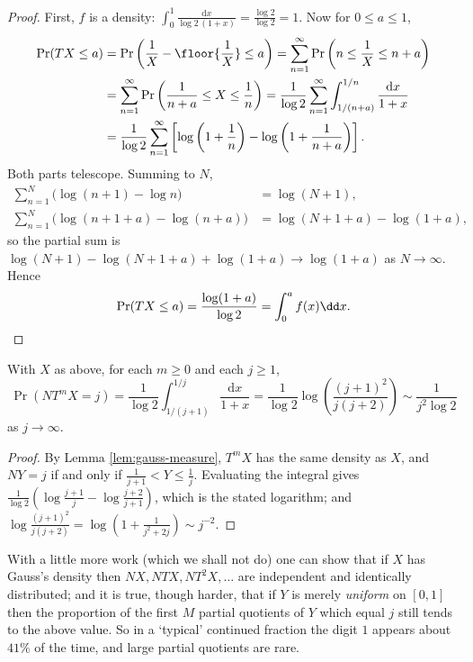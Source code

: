 \begin{proof}
	First, $f$ is a density: $\int_0^1\frac{\mathrm dx}{\log2\,(1+x)} = \frac{\log2}{\log2}=1$. Now for $0\leq a\leq 1$,
	\begin{align*}
		\Pr(TX\leq a) &= \Pr\left(\frac1X - \floor{\frac1X}\leq a\right) = \sum_{n=1}^\infty\Pr\left(n\leq\frac1X\leq n+a\right) \\
		&= \sum_{n=1}^\infty\Pr\left(\frac{1}{n+a}\leq X\leq\frac1n\right) = \frac{1}{\log2}\sum_{n=1}^\infty\int_{1/(n+a)}^{1/n}\frac{\mathrm dx}{1+x} \\
		&= \frac{1}{\log2}\sum_{n=1}^\infty\left[\log\left(1+\frac1n\right)-\log\left(1+\frac{1}{n+a}\right)\right].
	\end{align*}
	Both parts telescope. Summing to $N$,
	\begin{align*}
		\sum_{n=1}^N\big(\log(n+1)-\log n\big) &= \log(N+1), \\
		\sum_{n=1}^N\big(\log(n+1+a)-\log(n+a)\big) &= \log(N+1+a)-\log(1+a),
	\end{align*}
	so the partial sum is $\log(N+1)-\log(N+1+a)+\log(1+a) \to \log(1+a)$ as $N\to\infty$. Hence
	$$\Pr(TX\leq a) = \frac{\log(1+a)}{\log2} = \int_0^af(x)\dd x. \qedhere$$
\end{proof}

\begin{corollary}
	With $X$ as above, for each $m\geq0$ and each $j\geq1$,
	$$\Pr(NT^mX = j) = \frac{1}{\log2}\int_{1/(j+1)}^{1/j}\frac{\mathrm dx}{1+x} = \frac{1}{\log2}\log\left(\frac{(j+1)^2}{j(j+2)}\right) \sim \frac{1}{j^2\log 2}$$
	as $j\to\infty$.
\end{corollary}

\begin{proof}
	By Lemma \ref{lem:gauss-measure}, $T^mX$ has the same density as $X$, and $NY = j$ if and only if $\frac{1}{j+1}<Y\leq\frac1j$. Evaluating the integral gives $\frac{1}{\log2}\left(\log\frac{j+1}{j}-\log\frac{j+2}{j+1}\right)$, which is the stated logarithm; and $\log\frac{(j+1)^2}{j(j+2)} = \log\left(1+\frac{1}{j^2+2j}\right)\sim j^{-2}$.
\end{proof}

With a little more work (which we shall not do) one can show that if $X$ has Gauss's density then $NX, NTX, NT^2X,\ldots$ are independent and identically distributed; and it is true, though harder, that if $Y$ is merely \emph{uniform} on $[0,1]$ then the proportion of the first $M$ partial quotients of $Y$ which equal $j$ still tends to the above value. So in a `typical' continued fraction the digit $1$ appears about $41\%$ of the time, and large partial quotients are rare.

